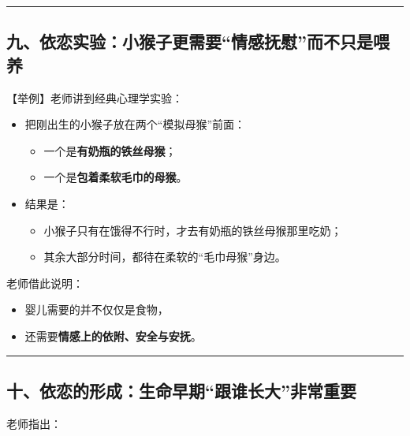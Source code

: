 \documentclass[
  chinese,
  9pt,
  a4paper,
]{ctexart}
\providecommand{\tightlist}{%
  \setlength{\itemsep}{0pt}\setlength{\parskip}{0pt}}
\begin{document}
\begin{center}\rule{0.5\linewidth}{0.5pt}\end{center}

\subsection{九、依恋实验：小猴子更需要``情感抚慰''而不只是喂养}\label{ux4e5dux4f9dux604bux5b9eux9a8cux5c0fux7334ux5b50ux66f4ux9700ux8981ux60c5ux611fux629aux6170ux800cux4e0dux53eaux662fux5582ux517b}

【举例】老师讲到经典心理学实验：

\begin{itemize}
\item
  把刚出生的小猴子放在两个``模拟母猴''前面：

  \begin{itemize}
  \tightlist
  \item
    一个是\textbf{有奶瓶的铁丝母猴}；
  \item
    一个是\textbf{包着柔软毛巾的母猴}。
  \end{itemize}
\item
  结果是：

  \begin{itemize}
  \tightlist
  \item
    小猴子只有在饿得不行时，才去有奶瓶的铁丝母猴那里吃奶；
  \item
    其余大部分时间，都待在柔软的``毛巾母猴''身边。
  \end{itemize}
\end{itemize}

老师借此说明：

\begin{itemize}
\tightlist
\item
  婴儿需要的并不仅仅是食物，
\item
  还需要\textbf{情感上的依附、安全与安抚}。
\end{itemize}

\begin{center}\rule{0.5\linewidth}{0.5pt}\end{center}

\subsection{十、依恋的形成：生命早期``跟谁长大''非常重要}\label{ux5341ux4f9dux604bux7684ux5f62ux6210ux751fux547dux65e9ux671fux8ddfux8c01ux957fux5927ux975eux5e38ux91cdux8981}

老师指出：
\end{document}
